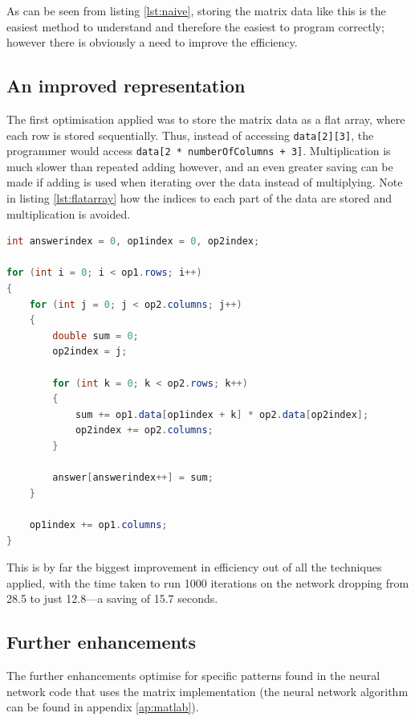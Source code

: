 As can be seen from listing \ref{lst:naive}, storing the matrix data like this is the easiest method to understand and therefore the easiest to program correctly; however there is obviously a need to improve the efficiency.

\subsection{An improved representation}

The first optimisation applied was to store the matrix data as a flat array, where each row is stored sequentially.  Thus, instead of accessing {\tt data[2][3]}, the programmer would access {\tt data[2 * numberOfColumns + 3]}.  Multiplication is much slower than repeated adding however, and an even greater saving can be made if adding is used when iterating over the data instead of multiplying.  Note in listing \ref{lst:flatarray} how the indices to each part of the data are stored and multiplication is avoided.

\begin{lstlisting}[language=java,caption={Multiply code with flat arrays},captionpos=b,label=lst:flatarray,float]
int answerindex = 0, op1index = 0, op2index;

for (int i = 0; i < op1.rows; i++)
{
    for (int j = 0; j < op2.columns; j++)
    {
        double sum = 0;
        op2index = j;

        for (int k = 0; k < op2.rows; k++)
        {
            sum += op1.data[op1index + k] * op2.data[op2index];
            op2index += op2.columns;
        }

        answer[answerindex++] = sum;
    }

    op1index += op1.columns;
}
\end{lstlisting}

This is by far the biggest improvement in efficiency out of all the techniques applied, with the time taken to run 1000 iterations on the network dropping from 28.5 to just 12.8---a saving of 15.7 seconds.

\subsection{Further enhancements}

The further enhancements optimise for specific patterns found in the neural network code that uses the matrix implementation (the neural network algorithm can be found in appendix \ref{ap:matlab}).

